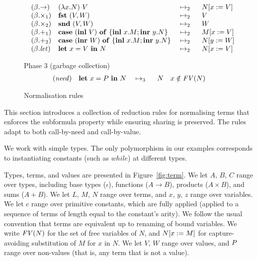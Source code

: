 {\begin{figure*}[t]
\[\begin{array}[t]{@{\quad}llll@{}}
(\beta.{\rightarrow})
& \expapp{(\expabs{x}{A}{N})}{V}
& \ \rewrite{}{2}{}\ \
& \sbs{N}{x}{V} \\

(\beta.{\times_1})
& \expfst{\expprd{V}{W}}
& \ \rewrite{}{2}{}\ \
& V \\

(\beta.{\times_2})
& \expsnd{\expprd{V}{W}}
& \ \rewrite{}{2}{}\ \
& W \\

(\beta.{+_1})
& \expcas{(\explft{V}{B})}{x}{M}{y}{N}
& \ \rewrite{}{2}{}\ \
& \sbs{M}{x}{V} \\

(\beta.{+_2})
& \expcas{(\exprgt{A}{W})}{x}{M}{y}{N}
& \ \rewrite{}{2}{}\ \
& \sbs{N}{y}{W} \\

(\beta.{\txt{let}})
& \expshr{x}{V}{N}
& \ \rewrite{}{2}{}\ \
& \sbs{N}{x}{V} \\
\end{array}
\]

\vspace{2ex}

Phase 3 (garbage collection)
\[
\begin{array}[t]{@{}llll@{\quad}l@{}}

(\txt{need})
& \expshr{x}{\nv}{N}
& \ \rewrite{}{3}{}\ \
& N %
& \cnd{%
       x \notin \fv{N}}\\
\end{array}
\]
\caption{Normalisation rules}
\label{fig:norm}
\end{figure*}
}



This section introduces a collection of reduction rules for
normalising terms that enforces the subformula property 
while ensuring sharing is preserved. The rules adapt to
both call-by-need and call-by-value.

We work with simple types. The only polymorphism in our examples
corresponds to instantiating constants (such as $\mathit{while}$) at
different types.

Types, terms, and values are presented in Figure~\ref{fig:term}. We
let $A$, $B$, $C$ range over types, including base types ($\iota$),
functions ($A \to B$), products ($A \times B$), and sums ($A + B$).
We let $L$, $M$, $N$ range over terms, and $x$, $y$, $z$ range over
variables.  We let $c$ range over primitive constants, which are fully
applied (applied to a sequence of terms of length equal to the
constant's arity).  We follow the usual convention that terms are
equivalent up to renaming of bound variables. We write $\text{\textit{FV}}(N)$ for
the set of free variables of $N$, and $N[x:=M]$ for
capture-avoiding substitution of $M$ for $x$ in $N$.
%
%
We let $V$, $W$ range over values, and $P$ range over non-values
(that is, any term that is not a value).

